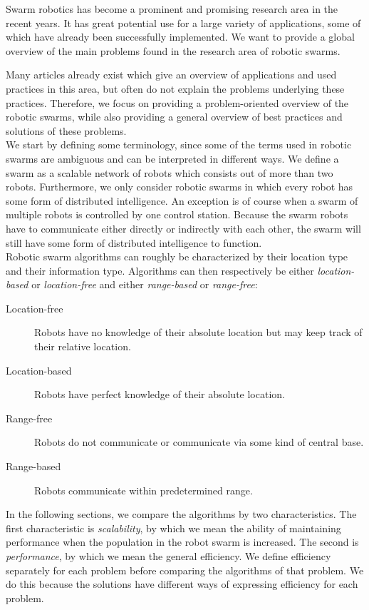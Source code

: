
Swarm robotics has become a prominent and promising research area in the recent years.
It has great potential use for a large variety of applications, some of which have already been successfully implemented.
We want to provide a global overview of the main problems found in the research area of robotic swarms.

Many articles already exist which give an overview of applications and used practices in this area, but often do not explain the problems underlying these practices.
Therefore, we focus on providing a problem-oriented overview of the robotic swarms, while also providing a general overview of best practices and solutions of these problems.\\

We start by defining some terminology, since some of the terms used in robotic swarms are ambiguous and can be interpreted in different ways.
We define a swarm as a scalable network of robots which consists out of more than two robots.
Furthermore, we only consider robotic swarms in which every robot has some form of distributed intelligence.
An exception is of course when a swarm of multiple robots is controlled by one control station.
Because the swarm robots have to communicate either directly or indirectly with each other, the swarm will still have some form of distributed intelligence to function.
\\
Robotic swarm algorithms can roughly be characterized by their location type and their information type. Algorithms can then respectively be either \emph{location-based} or \emph{location-free} and either \emph{range-based} or \emph{range-free}:
\begin{description}
  \item[Location-free] Robots have no knowledge of their absolute location but may keep track of their relative location.
  \item[Location-based] Robots have perfect knowledge of their absolute location.
  \item[Range-free] Robots do not communicate or communicate via some kind of central base.
  \item[Range-based] Robots communicate within predetermined range.
\end{description}

In the following sections, we compare the algorithms by two characteristics.
The first characteristic is \emph{scalability}, by which we mean the ability of maintaining performance when the population in the robot swarm is increased.
The second is \emph{performance}, by which we mean the general efficiency.
We define efficiency separately for each problem before comparing the algorithms of that problem.
We do this because the solutions have different ways of expressing efficiency for each problem.\\

